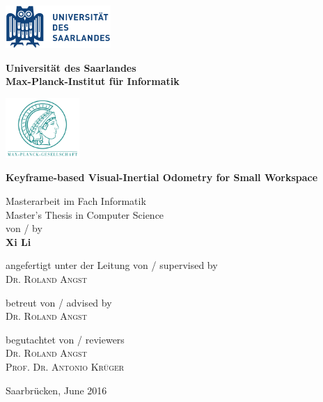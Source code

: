 \noindent
\begin{titlepage}
\includegraphics[width=4cm,natwidth=520,natheight=210]{logo_saarland.png}
\hfill
\begin{minipage}{8cm}
\centering
\vspace{-1.5cm} 
\textbf{Universit\"at des Saarlandes \\ Max-Planck-Institut f\"ur Informatik}
\end{minipage}
\hfill
\includegraphics[width=2.8cm,natwidth=300,natheight=244]{mpg.png}
\vfill

\Large
\textbf{Keyframe-based Visual-Inertial Odometry for Small Workspace}
\vfill

\large
Masterarbeit im Fach Informatik \\
Master's Thesis in Computer Science \\
von / by \\
\textbf{Xi Li} \\
\vfill

angefertigt unter der Leitung von / supervised by \\
\large{\textsc{Dr. Roland Angst}}\\
\vfill

betreut von / advised by \\
\large{\textsc{Dr. Roland Angst}} \\
\vfill

begutachtet von / reviewers \\
\large{\textsc{Dr. Roland Angst \\ Prof. Dr. Antonio Kr{\"u}ger}} \\
\vfill

Saarbr\"ucken, June 2016
\end{titlepage}



